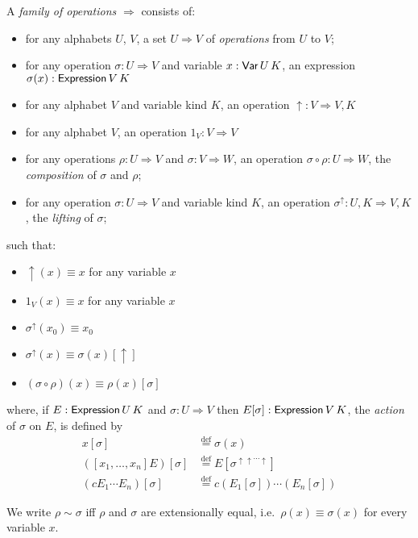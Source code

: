 \documentclass[envcountsame]{llncs}
\newcommand{\eqdef}{\ensuremath{\stackrel{\mathrm{def}}{=}}}
\begin{document}
\begin{definition}
 A \emph{family of operations} $\Rightarrow$ consists of:
 \begin{itemize}
  \item for any alphabets $U$, $V$, a set $U \Rightarrow V$ of \emph{operations} from $U$ to $V$;
  \item for any operation $\sigma : U \Rightarrow V$ and variable $x : \AgdaDatatype{Var} \, U \, K$, an expression $\sigma(x) : \AgdaFunction{Expression} \,
  V \, K$ %
  \item for any alphabet $V$ and variable kind $K$, an operation $\uparrow : V \Rightarrow V , K$
  \item for any alphabet $V$, an operation $1_V : V \Rightarrow V$
  \item for any operations $\rho : U \Rightarrow V$ and $\sigma : V \Rightarrow W$, an operation $\sigma \circ \rho : U \Rightarrow W$, the
  \emph{composition} of $\sigma$ and $\rho$;
  \item for any operation $\sigma : U \Rightarrow V$ and variable kind $K$, an operation $\sigma^\uparrow : U , K \Rightarrow V , K$, the \emph{lifting} of $\sigma$;
 \end{itemize}
such that:
\begin{itemize}
 \item $\uparrow(x) \equiv x$ for any variable $x$
 \item $1_V(x) \equiv x$ for any variable $x$
 \item $\sigma^\uparrow(x_0) \equiv x_0$ %
 \item $\sigma^\uparrow(x) \equiv \sigma(x) [ \uparrow ]$
 \item $(\sigma \circ \rho)(x) \equiv \rho(x) [ \sigma ]$
\end{itemize}
where, if $E : \AgdaFunction{Expression} \, U \, K$ and $\sigma : U \Rightarrow V$ then $E [ \sigma ] : \AgdaFunction{Expression} \, V \, K$,
the \emph{action} of $\sigma$ on $E$, is defined by
\begin{eqnarray*}
 x [ \sigma ] & \eqdef \sigma(x) \\
 ([x_1, \ldots, x_n] E) [ \sigma ] & \eqdef E [ \sigma^{\uparrow \uparrow \cdots \uparrow} ] \\
 (c E_1 \cdots E_n) [ \sigma ] & \eqdef c (E_1 [ \sigma ]) \cdots (E_n [ \sigma ])
\end{eqnarray*}

We write $\rho \sim \sigma$ iff $\rho$ and $\sigma$ are extensionally equal, i.e.~$\rho(x) \equiv \sigma(x)$ for every variable $x$.
\end{definition}
\end{document}

